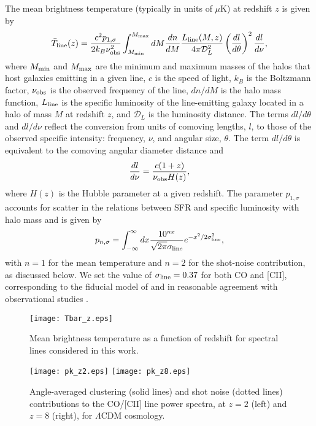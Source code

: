 \documentclass[twocolumn]{aastex631}
\newcommand{\be}{\begin{equation}}
\newcommand{\ee}{\end{equation}}
\begin{document}
The mean brightness temperature (typically in units of $\mu$K) at redshift $z$ is given by
\begin{equation}
\bar T_{\rm line} (z)  = \frac{c^2 p_{1,\sigma}}{2k_B \nu_{\rm obs}^2} \int_{M_{\rm min}}^{M_{\rm max}} dM \frac{dn}{dM} \frac{L_{\rm line}(M,z)}{4 \pi \mathcal{D}_{L}^{2}} \left ( \frac{dl}{d\theta} \right )^{2} \frac{dl}{d\nu},
\end{equation}
where $M_{\rm min}$ and $M_{\rm max}$ are the minimum and maximum masses of the halos that host galaxies emitting in a given line, $c$ is the speed of light, $k_B$ is the Boltzmann factor, $\nu_{\rm obs}$ is the observed frequency of the line, $dn/dM$ is the halo mass function, $L_{\rm line}$ is the specific luminosity of the line-emitting galaxy located in a halo of mass $M$ at redshift $z$, and ${\mathcal D}_L$ is the luminosity distance. The terms $dl/d\theta$ and $dl/d\nu$ reflect the conversion from units of comoving lengths, $l$, to those of the observed specific intensity: frequency, $\nu$, and angular size, $\theta$. The term $ dl/d\theta$ is equivalent to the comoving angular diameter distance and 
\begin{equation}
\frac{dl}{d\nu} = \frac{c(1+z)}{\nu_{\rm obs}H(z)}, 
\end{equation}
where $H(z)$ is the Hubble parameter at a given redshift. The parameter $p_{1,\sigma}$ accounts for scatter in the relations between SFR and specific luminosity with halo mass \citep{Li:2015gqa,Keating:2016pka} and is given by
\be\label{eq:scatter}
p_{n,\sigma} = \int_{-\infty}^\infty dx \frac{10^{n x}}{\sqrt{2\pi}\sigma_{\rm line}} e^{-x^2/2\sigma_{\rm line}^2},
\ee
with $n=1$ for the mean temperature and $n=2$ for the shot-noise contribution, as discussed below. We set the value of  $\sigma_{\rm line} = 0.37$ for both CO and [CII], corresponding to the fiducial model of \cite{Li:2015gqa} and in reasonable agreement with observational studies  \citep{Speagle2014,Carilli:2013qm,Kamenetzky_2016,Sargsyan2012}.

\begin{figure}[t]
    \flushleft\texttt{[image: Tbar\_z.eps]}\vspace{-.1in}
    \caption{Mean brightness temperature as a function of redshift for spectral lines considered in this work.}
    \label{fig:tbar}
\end{figure}

\begin{figure*}[htbp!]
    \centering
   \flushleft \texttt{[image: pk\_z2.eps]}
    \hspace{.5in}\texttt{[image: pk\_z8.eps]}\vspace{-.1in}
    \caption{Angle-averaged clustering (solid lines) and shot noise (dotted lines) contributions to the CO/[CII] line power spectra, at $z=2$ (left) and $z=8$ (right), for $\Lambda$CDM cosmology.}
    \label{fig:line_pk}\vspace{.2in}
\end{figure*}
\end{document}
